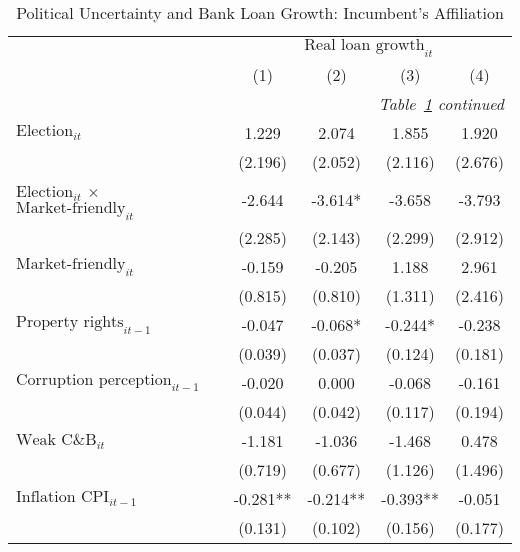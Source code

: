 \begin{longtable}{m{8cm}*{4}{c}}                                         \caption{Political Uncertainty and Bank Loan Growth: Incumbent's Affiliation\label{rlloans}}\\                                         \toprule                                         &\multicolumn{4}{c}{$\text{Real loan growth}_{it}$} \\ \cmidrule(lr){2-5}
                    &         (1)   &         (2)   &         (3)   &         (4)   \\
\midrule\endfirsthead                                         \multicolumn{5}{r}{\textit{Table~\ref{rlloans} continued}} \\                                         \toprule\endhead\midrule\endfoot\endlastfoot
$\text{Election}_{it}$&       1.229   &       2.074   &       1.855   &       1.920   \\
                    &     (2.196)   &     (2.052)   &     (2.116)   &     (2.676)   \\
$\text{Election}_{it}$ $\times$ $\text{Market-friendly}_{it}$&      -2.644   &      -3.614*  &      -3.658   &      -3.793   \\
                    &     (2.285)   &     (2.143)   &     (2.299)   &     (2.912)   \\
$\text{Market-friendly}_{it}$&      -0.159   &      -0.205   &       1.188   &       2.961   \\
                    &     (0.815)   &     (0.810)   &     (1.311)   &     (2.416)   \\
$\text{Property rights}_{it-1}$&      -0.047   &      -0.068*  &      -0.244*  &      -0.238   \\
                    &     (0.039)   &     (0.037)   &     (0.124)   &     (0.181)   \\
$\text{Corruption perception}_{it-1}$&      -0.020   &       0.000   &      -0.068   &      -0.161   \\
                    &     (0.044)   &     (0.042)   &     (0.117)   &     (0.194)   \\
$\text{Weak C\&B}_{it}$&      -1.181   &      -1.036   &      -1.468   &       0.478   \\
                    &     (0.719)   &     (0.677)   &     (1.126)   &     (1.496)   \\
$\text{Inflation CPI}_{it-1}$&      -0.281** &      -0.214** &      -0.393** &      -0.051   \\
                    &     (0.131)   &     (0.102)   &     (0.156)   &     (0.177)   \\

\end{longtable}
